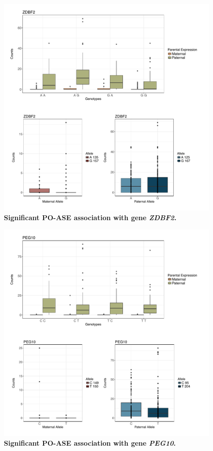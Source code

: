 \begin{figure}[!htb]
\centering \includegraphics[width=5in]{img/ch04/fig-10-ZDBF2.pdf}
\caption[Significant PO-ASE association with gene \emph{ZDBF2}.]{\textbf{Significant PO-ASE association with gene \emph{ZDBF2}.} }
\label{fig:ZDBF2}
\end{figure}


\begin{figure}[!htb]
\centering \includegraphics[width=5in]{img/ch04/fig-11-PEG10.pdf}
\caption[Significant PO-ASE association with gene \emph{PEG10}.]{\textbf{Significant PO-ASE association with gene \emph{PEG10}.} }
\label{fig:PEG10}
\end{figure}
\clearpage

